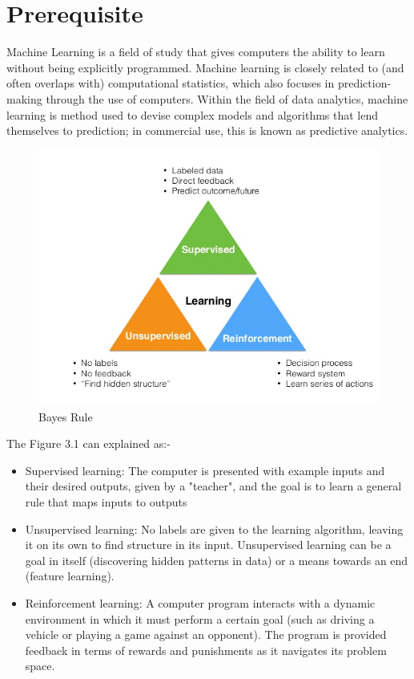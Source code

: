 \documentclass[paper=a4, fontsize=12pt]{scrartcl}
\numberwithin{equation}{section}		%
\numberwithin{figure}{section}			%
\numberwithin{table}{section}				%
\begin{document}
\section{Prerequisite}
Machine Learning is a field of study that gives computers the ability to learn without being explicitly programmed. Machine learning is closely related to (and often overlaps with) computational statistics, which also focuses in prediction-making through the use of computers. Within the field of data analytics, machine learning is method used to devise complex models and algorithms that lend themselves to prediction; in commercial use, this is known as predictive analytics.
\begin{figure}[H]

\begin{center}

\includegraphics[scale=.4]{ml2.jpg}

 \end{center}

  \caption{Bayes Rule}

  \label{fig:}

\end{figure}
The Figure 3.1 can explained as:- 
\begin{itemize}	
  \item Supervised learning: The computer is presented with example inputs and their desired outputs, given by a "teacher", and the goal is to learn a general rule that maps inputs to outputs
  \item Unsupervised learning: No labels are given to the learning algorithm, leaving it on its own to find structure in its input. Unsupervised learning can be a goal in itself (discovering hidden patterns in data) or a means towards an end (feature learning).
  \item  Reinforcement learning: A computer program interacts with a dynamic environment in which it must perform a certain goal (such as driving a vehicle or playing a game against an opponent). The program is provided feedback in terms of rewards and punishments as it navigates its problem space. 
\end{itemize}
\end{document}
